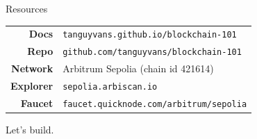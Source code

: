 \documentclass[aspectratio=169]{beamer}
\begin{document}
\begin{frame}{Resources}
\vspace{0.6em}
\centering

\begin{tabular}{rl}
  \textbf{Docs}     & \texttt{tanguyvans.github.io/blockchain-101} \\[0.3em]
  \textbf{Repo}     & \texttt{github.com/tanguyvans/blockchain-101} \\[0.3em]
  \textbf{Network}  & Arbitrum Sepolia (chain id 421614) \\[0.3em]
  \textbf{Explorer} & \texttt{sepolia.arbiscan.io} \\[0.3em]
  \textbf{Faucet}   & \texttt{faucet.quicknode.com/arbitrum/sepolia} \\
\end{tabular}

\vspace{1em}
\centering
{}

\vspace{1em}
{\Huge Let's build.}

\end{frame}
\end{document}
